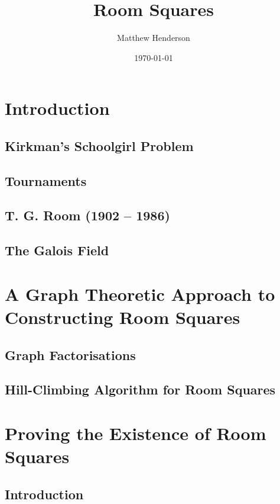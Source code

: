 \documentclass[a4paper, draft]{book}
\title{Room Squares}
\author{Matthew Henderson}
\date{\today}
\begin{document}
\frontmatter
\maketitle
\tableofcontents

\mainmatter

\chapter{Introduction}
  \label{ch:introduction}

\section{Kirkman’s Schoolgirl Problem}
  
\section{Tournaments}
  
\section{T. G. Room (1902 -- 1986)}
  
\section{The Galois Field}
  

\chapter{A Graph Theoretic Approach to Constructing Room Squares}
  \label{ch:graph-theoretic}

\section{Graph Factorisations}
  
\section{Hill-Climbing Algorithm for Room Squares}
  

\chapter{Proving the Existence of Room Squares}
  \label{ch:existence-proof}

\section{Introduction}
  
\end{document}
